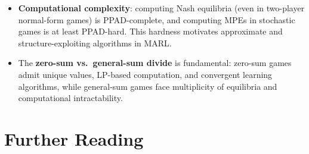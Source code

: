 \documentclass[11pt,a4paper]{article}
\begin{document}
\begin{itemize}
  \item \textbf{Computational complexity}: computing Nash equilibria
    (even in two-player normal-form games) is PPAD-complete, and
    computing MPEs in stochastic games is at least PPAD-hard.
    This hardness motivates approximate and structure-exploiting
    algorithms in MARL.

  \item The \textbf{zero-sum vs.\ general-sum divide} is fundamental:
    zero-sum games admit unique values, LP-based computation, and
    convergent learning algorithms, while general-sum games face
    multiplicity of equilibria and computational intractability.
\end{itemize}

\section{Further Reading}
\label{sec:further-reading}
\end{document}
